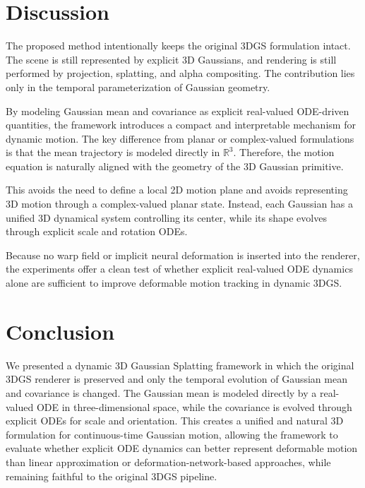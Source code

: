 \documentclass[11pt]{article}
\begin{document}
\section{Discussion}

The proposed method intentionally keeps the original 3DGS formulation intact. The scene is still represented by explicit 3D Gaussians, and rendering is still performed by projection, splatting, and alpha compositing. The contribution lies only in the temporal parameterization of Gaussian geometry.

By modeling Gaussian mean and covariance as explicit real-valued ODE-driven quantities, the framework introduces a compact and interpretable mechanism for dynamic motion. The key difference from planar or complex-valued formulations is that the mean trajectory is modeled directly in $\mathbb{R}^3$. Therefore, the motion equation is naturally aligned with the geometry of the 3D Gaussian primitive.

This avoids the need to define a local 2D motion plane and avoids representing 3D motion through a complex-valued planar state. Instead, each Gaussian has a unified 3D dynamical system controlling its center, while its shape evolves through explicit scale and rotation ODEs.

Because no warp field or implicit neural deformation is inserted into the renderer, the experiments offer a clean test of whether explicit real-valued ODE dynamics alone are sufficient to improve deformable motion tracking in dynamic 3DGS.

\section{Conclusion}

We presented a dynamic 3D Gaussian Splatting framework in which the original 3DGS renderer is preserved and only the temporal evolution of Gaussian mean and covariance is changed. The Gaussian mean is modeled directly by a real-valued ODE in three-dimensional space, while the covariance is evolved through explicit ODEs for scale and orientation. This creates a unified and natural 3D formulation for continuous-time Gaussian motion, allowing the framework to evaluate whether explicit ODE dynamics can better represent deformable motion than linear approximation or deformation-network-based approaches, while remaining faithful to the original 3DGS pipeline.
\end{document}
